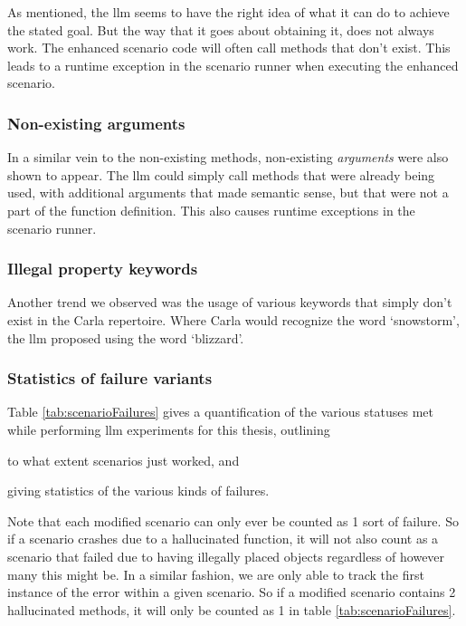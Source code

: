 As mentioned, the \acrshort{llm} seems to have the right idea of what it can do
to achieve the stated goal. But the way that it goes about obtaining it, does
not always work. The enhanced scenario code will often call methods that don't
exist. This leads to a runtime exception in the scenario runner when executing
the enhanced scenario.

\subsubsection{Non-existing arguments}

In a similar vein to the non-existing methods, non-existing \emph{arguments}
were also shown to appear. The \acrshort{llm} could simply call methods that
were already being used, with additional arguments that made semantic sense,
but that were not a part of the function definition. This also causes runtime
exceptions in the scenario runner.

\subsubsection{Illegal property keywords}

Another trend we observed was the usage of various keywords that simply don't
exist in the Carla repertoire. Where Carla would recognize the word `snowstorm',
the \acrfull{llm} proposed using the word `blizzard'.


\subsubsection{Statistics of failure variants}

Table \ref{tab:scenarioFailures} gives a quantification of the various statuses met while performing
\acrshort{llm} experiments for this thesis, outlining \begin{inparaenum}
    \item to what extent scenarios just worked, and
    \item giving statistics of the various kinds of failures.
\end{inparaenum} Note that each modified scenario can only ever be
counted as \num{1} sort of failure. So if a scenario crashes due to a hallucinated function, it
will not also count as a scenario that failed due to having illegally placed objects regardless of
however many this might be. In a similar fashion, we are only able to track the first instance of
the error within a given scenario. So if a modified scenario contains \num{2} hallucinated methods,
it will only be counted as \num{1} in table \ref{tab:scenarioFailures}.

